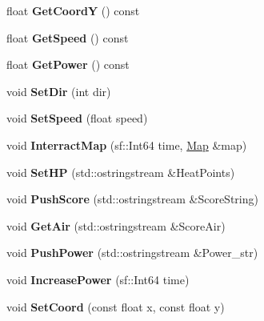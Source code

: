 \begin{DoxyCompactItemize}
float {\bfseries Get\+CoordY} () const
\item 
\mbox{\label{class_player_a859e61a326e4700ad455be2efa887af9}} 
float {\bfseries Get\+Speed} () const
\item 
\mbox{\label{class_player_ab9b38c788867a135ba1d8fe8e54ed9c7}} 
float {\bfseries Get\+Power} () const
\item 
\mbox{\label{class_player_a2fd2366f2ae52f3bf13f6ef3fa81e508}} 
void {\bfseries Set\+Dir} (int dir)
\item 
\mbox{\label{class_player_a2b84b6227dba65e2c5e9a66d0f96e759}} 
void {\bfseries Set\+Speed} (float speed)
\item 
\mbox{\label{class_player_adb838303b0c98d8f007bebb1a53e12b7}} 
void {\bfseries Interract\+Map} (sf\+::\+Int64 time, \hyperlink{class_map}{Map} \&map)
\item 
\mbox{\label{class_player_aea8dbe8f9812a6828c1709972c4c559b}} 
void {\bfseries Set\+HP} (std\+::ostringstream \&Heat\+Points)
\item 
\mbox{\label{class_player_a9fac998af5b803e87532df34766d2391}} 
void {\bfseries Push\+Score} (std\+::ostringstream \&Score\+String)
\item 
\mbox{\label{class_player_a62c904fc9e79a9012cfd449e201554f2}} 
void {\bfseries Get\+Air} (std\+::ostringstream \&Score\+Air)
\item 
\mbox{\label{class_player_ad92f3ca39bcc0b8739f71659285ea5e6}} 
void {\bfseries Push\+Power} (std\+::ostringstream \&Power\+\_\+str)
\item 
\mbox{\label{class_player_a84627845c5841d3cc13f95e6972241e6}} 
void {\bfseries Increase\+Power} (sf\+::\+Int64 time)
\item 
\mbox{\label{class_player_acf68380dc8a0481fd60194252b053a3a}} 
void {\bfseries Set\+Coord} (const float x, const float y)
\item 
\mbox{\label{class_player_a265a11fc851ad9c8e4e2a80006ab80d1}} 

\end{DoxyCompactItemize}
